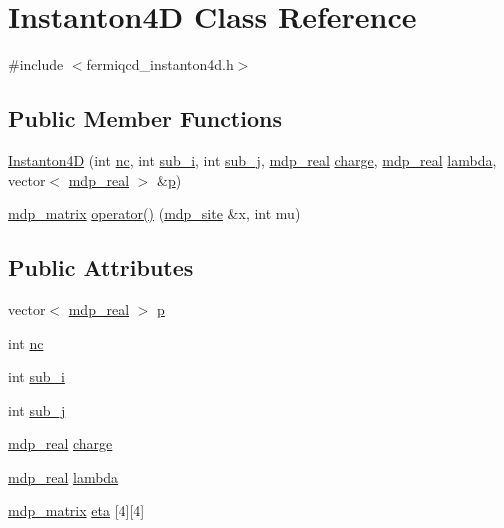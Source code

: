 \hypertarget{class_instanton4_d}{}\section{Instanton4D Class Reference}
\label{class_instanton4_d}


{\ttfamily \#include $<$fermiqcd\+\_\+instanton4d.\+h$>$}

\subsection*{Public Member Functions}
\begin{DoxyCompactItemize}
\item 
\hyperlink{class_instanton4_d_ab23484422ea50f59e0856d51cce1cb8b}{Instanton4D} (int \hyperlink{class_instanton4_d_af8271a542264493caafca9443b0c2f38}{nc}, int \hyperlink{class_instanton4_d_a33c37212ef923556b7a1985d9e7cdd36}{sub\+\_\+i}, int \hyperlink{class_instanton4_d_af73c30a26883977d21e2b2e8921429cf}{sub\+\_\+j}, \hyperlink{mdp__global__vars_8h_a69d96b74c791e0bbdb888b3913a69450}{mdp\+\_\+real} \hyperlink{class_instanton4_d_a81408020baf1ea808456d691c65425e2}{charge}, \hyperlink{mdp__global__vars_8h_a69d96b74c791e0bbdb888b3913a69450}{mdp\+\_\+real} \hyperlink{class_instanton4_d_a69a7961ae8d9ea823cacbf8cc11bc46f}{lambda}, vector$<$ \hyperlink{mdp__global__vars_8h_a69d96b74c791e0bbdb888b3913a69450}{mdp\+\_\+real} $>$ \&\hyperlink{class_instanton4_d_a3d78aada54a0f8e7bafb5272cb5ca401}{p})
\item 
\hyperlink{classmdp__matrix}{mdp\+\_\+matrix} \hyperlink{class_instanton4_d_aa03767e0f05830b33e34b3be0f9fc447}{operator()} (\hyperlink{classmdp__site}{mdp\+\_\+site} \&x, int mu)
\end{DoxyCompactItemize}
\subsection*{Public Attributes}
\begin{DoxyCompactItemize}
\item 
vector$<$ \hyperlink{mdp__global__vars_8h_a69d96b74c791e0bbdb888b3913a69450}{mdp\+\_\+real} $>$ \hyperlink{class_instanton4_d_a3d78aada54a0f8e7bafb5272cb5ca401}{p}
\item 
int \hyperlink{class_instanton4_d_af8271a542264493caafca9443b0c2f38}{nc}
\item 
int \hyperlink{class_instanton4_d_a33c37212ef923556b7a1985d9e7cdd36}{sub\+\_\+i}
\item 
int \hyperlink{class_instanton4_d_af73c30a26883977d21e2b2e8921429cf}{sub\+\_\+j}
\item 
\hyperlink{mdp__global__vars_8h_a69d96b74c791e0bbdb888b3913a69450}{mdp\+\_\+real} \hyperlink{class_instanton4_d_a81408020baf1ea808456d691c65425e2}{charge}
\item 
\hyperlink{mdp__global__vars_8h_a69d96b74c791e0bbdb888b3913a69450}{mdp\+\_\+real} \hyperlink{class_instanton4_d_a69a7961ae8d9ea823cacbf8cc11bc46f}{lambda}
\item 
\hyperlink{classmdp__matrix}{mdp\+\_\+matrix} \hyperlink{class_instanton4_d_ae318efcecc72b47fb7b43bcf0222697f}{eta} \mbox{[}4\mbox{]}\mbox{[}4\mbox{]}
\end{DoxyCompactItemize}


